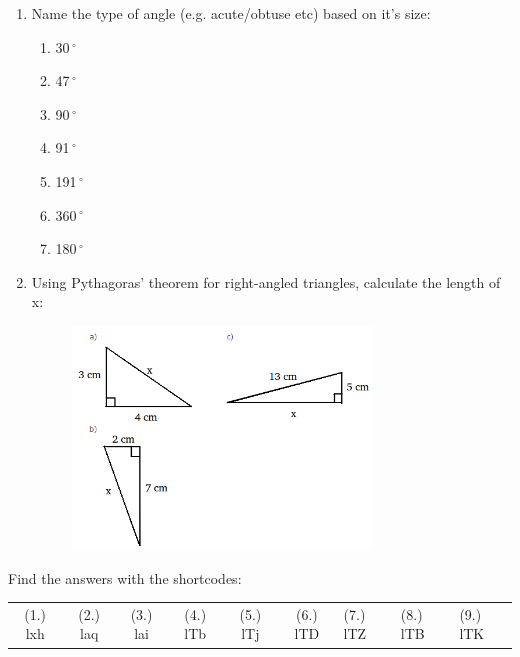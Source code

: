 \begin{enumerate}[noitemsep, label=\textbf{\arabic*}. ]
\label{m39368*uid143}\item Name the type of angle (e.g. acute/obtuse etc) based on it's size:
\label{m39368*id401235}\begin{enumerate}[noitemsep, label=\textbf{\alph*}. ] 
            \item  30\ensuremath{{\,}^{\circ}}\item  47\ensuremath{{\,}^{\circ}}\item  90\ensuremath{{\,}^{\circ}}\item  91\ensuremath{{\,}^{\circ}}\item  191\ensuremath{{\,}^{\circ}}\item  360\ensuremath{{\,}^{\circ}}\item  180\ensuremath{{\,}^{\circ}}\end{enumerate}
\label{m39368*uid144}\item Using Pythagoras' theorem for right-angled triangles, calculate the length of x:
    \setcounter{subfigure}{0}
	\begin{figure}[H] %
    \begin{center}
    \label{m39368*id401236!!!underscore!!!media}\label{m39368*id401236!!!underscore!!!printimage}\includegraphics[width=300px]{col11306.imgs/m39368_MG10C13_070.png} %
      \vspace{2pt}
    \vspace{.1in}
    \end{center}
 \end{figure}       
\end{enumerate}
      \label{m39368*uid132}
\par {} Find the answers with the shortcodes:
 \par \begin{tabular}[h]{cccccc}
 (1.) lxh  &  (2.) laq  &  (3.) lai  &  (4.) lTb  &  (5.) lTj  &  (6.) lTD  &  (7.) lTZ  &  (8.) lTB  &  (9.) lTK  & \end{tabular}
